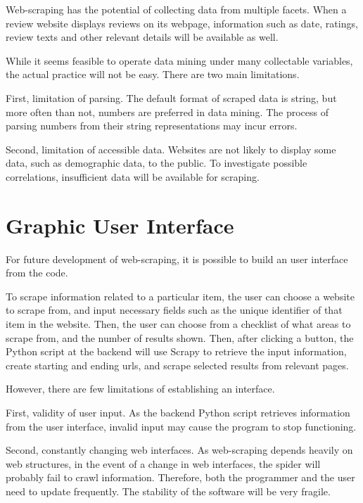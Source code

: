 \documentclass[12pt]{report}
\begin{document}
Web-scraping has the potential of collecting data from multiple facets. When a review website displays reviews on its webpage, information such as date, ratings, review texts and other relevant details will be available as well. 

While it seems feasible to operate data mining under many collectable variables, the actual practice will not be easy. There are two main limitations.

First, limitation of parsing. The default format of scraped data is string, but more often than not, numbers are preferred in data mining. The process of parsing numbers from their string representations may incur errors.

Second, limitation of accessible data. Websites are not likely to display some data, such as demographic data, to the public. To investigate possible correlations, insufficient data will be available for scraping.


\section{Graphic User Interface}

For future development of web-scraping, it is possible to build an user interface from the code. 

To scrape information related to a particular item, the user can choose a website to scrape from, and input necessary fields such as the unique identifier of that item in the website. Then, the user can choose from a checklist of what areas to scrape from, and the number of results shown. Then, after clicking a button, the Python script at the backend will use Scrapy to retrieve the input information, create starting and ending urls, and scrape selected results from relevant pages.

However, there are few limitations of establishing an interface.

First, validity of user input. As the backend Python script retrieves information from the user interface, invalid input may cause the program to stop functioning.

Second, constantly changing web interfaces. As web-scraping depends heavily on web structures, in the event of a change in web interfaces, the spider will probably fail to crawl information. Therefore, both the programmer and the user need to update frequently. The stability of the software will be very fragile.
\end{document}
